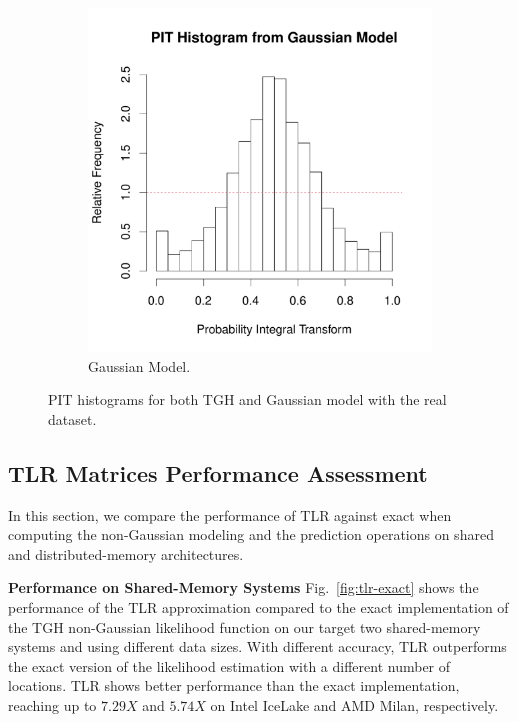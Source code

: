 \documentclass[conference]{IEEEtran}
\begin{document}
\begin{figure}[h]
\begin{subfigure}{.23\textwidth}
  \includegraphics[width=\linewidth]{./figures/PIT_real_Gaussian.pdf}
  \caption{Gaussian Model.}
\end{subfigure}
  \caption{PIT histograms for both TGH and Gaussian model with the real dataset. }
  \label{fig:PIT_real}
\end{figure}

\subsection{TLR Matrices Performance Assessment}
In this section, we compare the performance of TLR 
against exact when computing the non-Gaussian modeling and the prediction operations
on shared and distributed-memory architectures. 



\textbf{Performance on Shared-Memory Systems}
Fig.~\ref{fig:tlr-exact} shows the performance of the
TLR approximation compared to the exact implementation
of the TGH non-Gaussian likelihood function on our target two
shared-memory systems and using different data sizes.  With different accuracy, TLR outperforms the exact version of the likelihood estimation with a different number of locations. TLR shows better performance than the exact implementation, reaching up to $7.29X$ and $5.74X$ on Intel IceLake and AMD Milan, respectively.   
\end{document}
